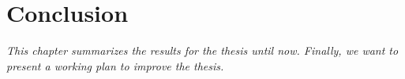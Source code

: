 \chapter{Conclusion}
\label{chap:conclusion}
	\textit{This chapter summarizes the results for the thesis until now. Finally, we want to present a working plan to improve the thesis.}
\minitoc

	
	
	 
	 
	 
